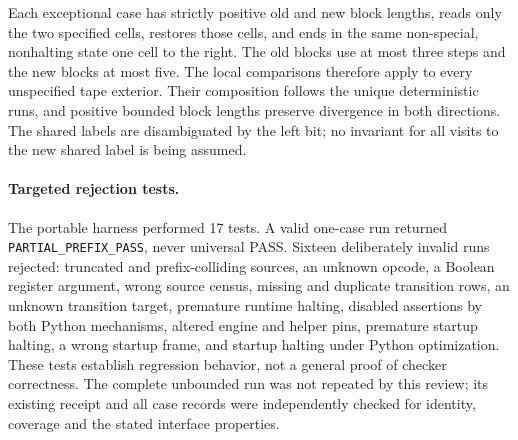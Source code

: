 Each exceptional case has strictly positive old and new block lengths,
reads only the two specified cells, restores those cells, and ends in the
same non-special, nonhalting state one cell to the right. The old blocks
use at most three steps and the new blocks at most five. The local
comparisons therefore apply to every unspecified tape exterior. Their
composition follows the unique deterministic runs, and positive bounded
block lengths preserve divergence in both directions. The shared labels
are disambiguated by the left bit; no invariant for all visits to the new
shared label is being assumed.

\paragraph{Targeted rejection tests.}
The portable harness performed 17 tests. A valid one-case run returned
\texttt{PARTIAL\_PREFIX\_PASS}, never universal PASS. Sixteen deliberately
invalid runs rejected: truncated and prefix-colliding sources, an unknown
opcode, a Boolean register argument, wrong source census, missing and
duplicate transition rows, an unknown transition target, premature
runtime halting, disabled assertions by both Python mechanisms, altered
engine and helper pins, premature startup halting, a wrong startup frame,
and startup halting under Python optimization. These tests establish
regression behavior, not a general proof of checker correctness. The
complete unbounded run was not repeated by this review; its existing
receipt and all case records were independently checked for identity,
coverage and the stated interface properties.
